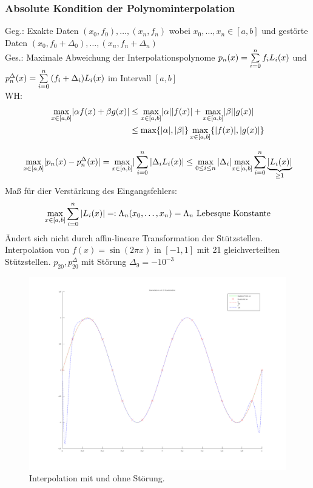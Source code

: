 \subsubsection{Absolute Kondition der Polynominterpolation}
Geg.: Exakte Daten $(x_0, f_0), \ldots, (x_n, f_n)$ wobei $x_0, \ldots, x_n \in [a, b]$ und
gestörte Daten $(x_0, f_0 + \Delta_0), \ldots, (x_n, f_n + \Delta_n)$ \\
Ges.: Maximale Abweichung der Interpolationspolynome $p_n(x) = \sum\limits_{i=0}^{n}{f_i L_i(x)}$ und
$p^{\Delta}_n(x) = \sum\limits_{i=0}^{n}{(f_i + \Delta_i) L_i(x)}$ im Intervall $[a, b]$ \\
WH:
\begin{align*}
  \underset{x \in [a, b]}{\max} |\alpha f(x) + \beta g(x)| &\leq
    \underset{x \in [a, b]}{\max} |\alpha| |f(x)| + \underset{x \in [a, b]}{\max} |\beta| |g(x)| \\
  &\leq \max\{|\alpha|, |\beta|\}\, \underset{x \in [a, b]}{\max}\{|f(x)|, |g(x)|\}
\end{align*}

\begin{align*}
  \underset{x \in [a, b]}{\max} |p_n(x) - p^{\Delta}_n(x)| = \underset{x \in [a, b]}{\max} | \sum\limits_{i=0}^{n}{|\Delta_i L_i(x)} | \leq
  \underset{0 \leq i \leq n}{\max}\,|\Delta_i| \underset{x \in [a, b]}{\max} \sum\limits_{i=0}^{n}{\underbrace{|L_i(x)|}_{\geq 1}}
\end{align*}
Maß für dier Verstärkung des Eingangsfehlers:
\begin{equation*}
  \underset{x \in [a, b]}{\max} \sum\limits_{i=0}^{n}{|L_i(x)|} =: \Lambda_n(x_0, \dots, x_n) = \Lambda_n 
  \text{ Lebesque Konstante}
\end{equation*}
Ändert sich nicht durch affin-lineare Transformation der Stützstellen.
 Interpolation von $f(x) =\sin(2\pi x)$ in $[-1, 1]$ mit 21
gleichverteilten Stützstellen. $p_{20}, p_{20}^\Delta$ mit Störung $\Delta_9 = -10^{-3}$
\begin{figure}[htbp]
  \centering
  \includegraphics[width=\textwidth]{figures/interpolation_stoerung.png}
  \caption{Interpolation mit und ohne Störung.}
  \label{fig:interpolation-stoerung}
\end{figure}

